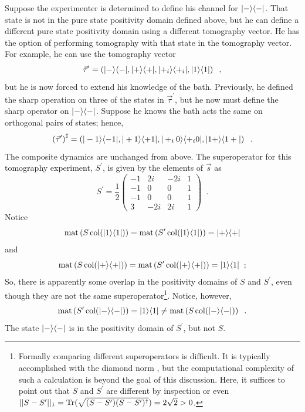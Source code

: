 Suppose the experimenter is determined to define his channel for $|-\rangle\langle-|$.  That state is not in the pure state positivity domain defined above, but he can define a different pure state positivity domain using a different tomography vector.  He has the option of performing tomography with that state in the tomography vector.  For example, he can use the tomography vector
$$
\vec{\tau}^\prime = \left(|-\rangle\langle-|,|+\rangle\langle+|,|+_i\rangle\langle+_i|,|1\rangle\langle1|\right)\;\;,
$$
but he is now forced to extend his knowledge of the bath.  Previously, he defined the sharp operation on three of the states in $\vec{\tau}^\prime$, but he now must define the sharp operator on $|-\rangle\langle-|$.  Suppose he knows the bath acts the same on orthogonal pairs of states; hence,
$$
\left(\vec{\tau}^\prime\right)^\sharp = \left(|-1\rangle\langle-1|,|+1\rangle\langle+1|,|+_i0\rangle\langle+_i0|,|1+\rangle\langle1+|\right)\;\;.
$$
The composite dynamics are unchanged from above.  The superoperator for this tomography experiment, $S^\prime$, is given by the elements of $\vec{s}$ as
$$
S^\prime = \frac{1}{2}\begin{pmatrix}
-1&2i&-2i&1\\
-1&0&0&1\\
-1&0&0&1\\
3&-2i&2i&1
\end{pmatrix}\;\;.
$$
Notice
$$
\operatorname{mat}\left(S\operatorname{col}(|1\rangle\langle1|)\right) = \operatorname{mat}\left(S^\prime\operatorname{col}(|1\rangle\langle1|)\right) = |+\rangle\langle+|
$$
and
$$
\operatorname{mat}\left(S\operatorname{col}(|+\rangle\langle+|)\right) = \operatorname{mat}\left(S^\prime\operatorname{col}(|+\rangle\langle+|)\right) = |1\rangle\langle1|\;\;;
$$
So, there is apparently some overlap in the positivity domains of $S$ and $S^\prime$, even though they are not the same superoperator\footnote{Formally comparing different superoperators is difficult.  It is typically accomplished with the diamond norm \cite{Kitaev1998}, but the computational complexity of such a calculation is beyond the goal of this discussion.  Here, it suffices to point out that $S$ and $S^\prime$ are different by inspection or even $||S-S^\prime||_1 = \operatorname{Tr}(\sqrt{(S-S^\prime)(S-S^\prime)^\dagger}) = 2\sqrt{2} >0$.}.  Notice, however,
$$
\operatorname{mat}\left(S^\prime \operatorname{col}(|-\rangle\langle-|)\right) = |1\rangle\langle1| \neq \operatorname{mat}\left(S \operatorname{col}(|-\rangle\langle-|)\right)\;\;.
$$
The state $|-\rangle\langle-|$ is in the positivity domain of $S^\prime$, but not $S$.

